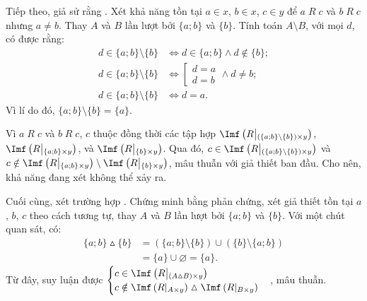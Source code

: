 Tiếp theo, giả sử rằng . Xét khả năng tồn tại $a \in x$, $b \in x$, $c \in y$ để $a\;R\;c$ và $b\;R\;c$ nhưng $a \neq b$. Thay $A$ và $B$ lần lượt bởi $\{a; b\}$ và $\{b\}$. Tính toán $A \setminus B$, với mọi $d$, có được rằng:
\begin{align*}
   d \in \{a; b\} \setminus \{b\} &\iff d \in \{a; b\} \land d \notin \{b\}; \\
   d \in \{a; b\} \setminus \{b\} &\iff \left[\begin{aligned}
      d = a \\
      d = b
   \end{aligned}\right. \land d \neq b; \\
   d \in \{a; b\} \setminus \{b\} &\iff d = a. 
\end{align*}
Vì lí do đó, $\{a; b\} \setminus \{b\} = \{a\}$.

Vì $a\;R\;c$ và $b\;R\;c$, $c$ thuộc đồng thời các tập hợp $\Imf\left(R\middle|_{(\{a; b\} \setminus \{b\}) \times y}\right)$, $\Imf\left(R\middle|_{\{a; b\} \times y}\right)$, và $\Imf\left(R\middle|_{\{b\} \times y}\right)$. Qua đó, $c \in \Imf\left(R\middle|_{(\{a; b\} \setminus \{b\}) \times y}\right)$ và $c \notin \Imf\left(R\middle|_{\{a; b\} \times y}\right) \setminus \Imf\left(R\middle|_{\{b\} \times y}\right)$, mâu thuẫn với giả thiết ban đầu. Cho nên, khả năng đang xét không thể xảy ra.

Cuối cùng, xét trường hợp . Chứng minh bằng phản chứng, xét giả thiết tồn tại $a$, $b$, $c$ theo cách tương tự, thay $A$ và $B$ lần lượt bởi $\{a; b\}$ và $\{b\}$. Với một chút quan sát, có: 
\begin{align*}
   \{a; b\} \vartriangle \{b\} &= \left(\{a; b\} \setminus \{b\}\right) \cup \left(\{b\} \setminus \{a; b\}\right) \\
      &= \{a\} \cup \varnothing = \{a\}.
\end{align*}
Từ đây, suy luận được $\begin{cases}
   c \in \Imf\left(R\middle|_{(A \vartriangle B) \times y}\right) \\
   c \notin \Imf\left(R\middle|_{A \times y}\right) \vartriangle \Imf\left(R\middle|_{B \times y}\right) 
\end{cases}$, mâu thuẫn.

